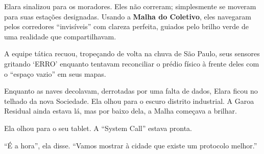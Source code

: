 Elara sinalizou para os moradores. Eles não correram; simplesmente se moveram para suas estações designadas. Usando a \textbf{Malha do Coletivo}, eles navegaram pelos corredores ``invisíveis'' com clareza perfeita, guiados pelo brilho verde de uma realidade que compartilhavam.

A equipe tática recuou, tropeçando de volta na chuva de São Paulo, seus sensores gritando `ERRO' enquanto tentavam reconciliar o prédio físico à frente deles com o ``espaço vazio'' em seus mapas.

Enquanto as naves decolavam, derrotadas por uma falta de dados, Elara ficou no telhado da nova Sociedade. Ela olhou para o escuro distrito industrial. A Garoa Residual ainda estava lá, mas por baixo dela, a Malha começava a brilhar.

Ela olhou para o seu tablet. A ``System Call'' estava pronta.

``É a hora'', ela disse. ``Vamos mostrar à cidade que existe um protocolo melhor.''
